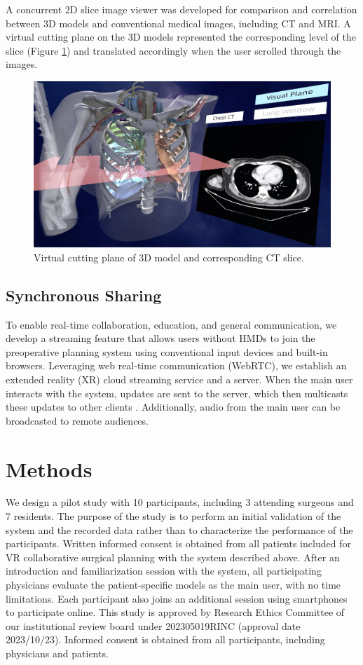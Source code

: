 \documentclass{bmcart}
\begin{document}
A concurrent 2D slice image viewer was developed for comparison and correlation between 3D models and conventional medical images, including CT and MRI. A virtual cutting plane on the 3D models represented the corresponding level of the slice (Figure \ref{fig:CuttingPlane}) and translated accordingly when the user scrolled through the images.
\begin{figure}
  \centering
  \includegraphics[width=.9\linewidth]{../Media/CuttingPlane.png}  
  \caption{Virtual cutting plane of 3D model and corresponding CT slice.}
  \label{fig:CuttingPlane}
\end{figure}
\subsection{Synchronous Sharing}
To enable real-time collaboration, education, and general communication, we develop a streaming feature that allows users without HMDs to join the preoperative planning system using conventional input devices and built-in browsers. Leveraging web real-time communication (WebRTC), we establish an extended reality (XR) cloud streaming service and a server. When the main user interacts with the system, updates are sent to the server, which then multicasts these updates to other clients \cite{RN12}. Additionally, audio from the main user can be broadcasted to remote audiences.
\section{Methods}
We design a pilot study with 10 participants, including 3 attending surgeons and 7 residents. The purpose of the study is to perform an initial validation of the system and the recorded data rather than to characterize the performance of the participants. Written informed consent is obtained from all patients included for VR collaborative surgical planning with the system described above. After an introduction and familiarization session with the system, all participating physicians evaluate the patient-specific models as the main user, with no time limitations. Each participant also joins an additional session using smartphones to participate online. This study is approved by Research Ethics Committee of our institutional review board under 202305019RINC (approval date 2023/10/23). Informed consent is obtained from all participants, including physicians and patients.
\end{document}
